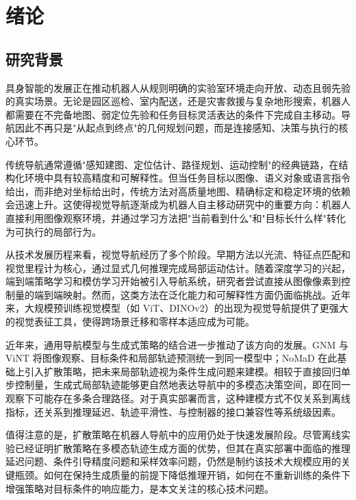 
\chapter{绪论}

\section{研究背景}

具身智能的发展正在推动机器人从规则明确的实验室环境走向开放、动态且弱先验的真实场景。无论是园区巡检、室内配送，还是灾害救援与复杂地形搜索，机器人都需要在不完备地图、弱定位先验和任务目标灵活表达的条件下完成自主移动。导航因此不再只是"从起点到终点"的几何规划问题，而是连接感知、决策与执行的核心环节\cite{thrun2005probabilistic}。

传统导航通常遵循"感知建图、定位估计、路径规划、运动控制"的经典链路，在结构化环境中具有较高精度和可解释性\cite{orbslam3_2021,cartographer2016}。但当任务目标以图像、语义对象或语言指令给出，而非绝对坐标给出时，传统方法对高质量地图、精确标定和稳定环境的依赖会迅速上升\cite{anderson2018evaluation}。这使得视觉导航逐渐成为机器人自主移动研究中的重要方向：机器人直接利用图像观察环境，并通过学习方法把"当前看到什么"和"目标长什么样"转化为可执行的局部行为。

从技术发展历程来看，视觉导航经历了多个阶段。早期方法以光流、特征点匹配和视觉里程计为核心，通过显式几何推理完成局部运动估计\cite{thrun2005probabilistic}。随着深度学习的兴起，端到端策略学习和模仿学习开始被引入导航系统，研究者尝试直接从图像像素到控制量的端到端映射\cite{zhu2017targetdriven}。然而，这类方法在泛化能力和可解释性方面仍面临挑战。近年来，大规模预训练视觉模型（如 ViT、DINOv2）的出现为视觉导航提供了更强大的视觉表征工具，使得跨场景迁移和零样本适应成为可能\cite{vit2020,dit2022}。

近年来，通用导航模型与生成式策略的结合进一步推动了该方向的发展。GNM 与 ViNT 将图像观察、目标条件和局部轨迹预测统一到同一模型中\cite{gnm2022,vint2023}；NoMaD 在此基础上引入扩散策略，把未来局部轨迹视为条件生成问题来建模\cite{nomad2023,diffusionpolicy2023}。相较于直接回归单步控制量，生成式局部轨迹能够更自然地表达导航中的多模态决策空间，即在同一观察下可能存在多条合理路径。对于真实部署而言，这种建模方式不仅关系到离线指标，还关系到推理延迟、轨迹平滑性、与控制器的接口兼容性等系统级因素。

值得注意的是，扩散策略在机器人导航中的应用仍处于快速发展阶段。尽管离线实验已经证明扩散策略在多模态轨迹生成方面的优势，但其在真实部署中面临的推理延迟问题、条件引导精度问题和采样效率问题，仍然是制约该技术大规模应用的关键瓶颈。如何在保持生成质量的前提下降低推理开销，如何在不重新训练的条件下增强策略对目标条件的响应能力，是本文关注的核心技术问题。

